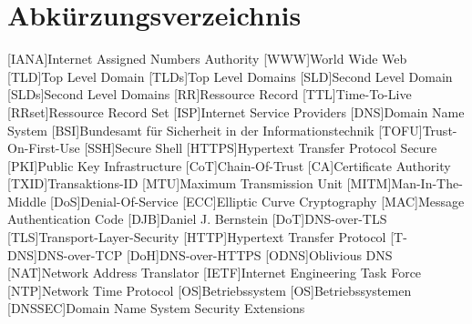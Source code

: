 \documentclass[Bachelor, BIC, german]{twbook}
\begin{document}
\chapter*{Abkürzungsverzeichnis}
\begin{acronym}[XXXXX]
    [IANA]{Internet Assigned Numbers Authority}
    [WWW]{World Wide Web}
    [TLD]{Top Level Domain}
    [TLDs]{Top Level Domains}
    [SLD]{Second Level Domain}
    [SLDs]{Second Level Domains}
    [RR]{Ressource Record}
    [TTL]{Time-To-Live}
    [RRset]{Ressource Record Set}
    [ISP]{Internet Service Providers}
    [DNS]{Domain Name System}
    [BSI]{Bundesamt für Sicherheit in der Informationstechnik}
    [TOFU]{Trust-On-First-Use}
    [SSH]{Secure Shell}
    [HTTPS]{Hypertext Transfer Protocol Secure}
    [PKI]{Public Key Infrastructure}
    [CoT]{Chain-Of-Trust}
    [CA]{Certificate Authority}
    [TXID]{Transaktions-ID}
    [MTU]{Maximum Transmission Unit}
    [MITM]{Man-In-The-Middle}
    [DoS]{Denial-Of-Service}
    [ECC]{Elliptic Curve Cryptography}
    [MAC]{Message Authentication Code}
    [DJB]{Daniel J. Bernstein}
    [DoT]{DNS-over-TLS}
    [TLS]{Transport-Layer-Security}
    [HTTP]{Hypertext Transfer Protocol}
    [T-DNS]{DNS-over-TCP}
    [DoH]{DNS-over-HTTPS}
    [ODNS]{Oblivious DNS}
    [NAT]{Network Address Translator}
    [IETF]{Internet Engineering Task Force}
    [NTP]{Network Time Protocol}
    [OS]{Betriebssystem}
    [OS]{Betriebssystemen}
    [DNSSEC]{Domain Name System Security Extensions}
\end{acronym}




\end{document}
